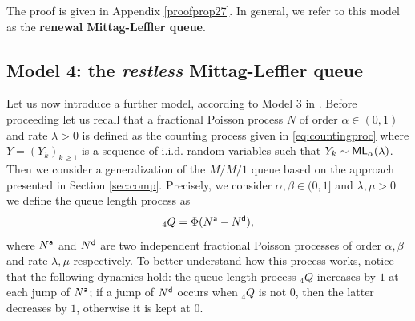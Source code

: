\documentclass[]{amsart}
\numberwithin{equation}{section}
\theoremstyle{remark}
\theoremstyle{definition}
\begin{document}
{The proof is given in Appendix \ref{proofprop27}. In general, we refer to this model as the \textbf{renewal Mittag-Leffler queue}.}



\subsection{Model 4: the \textit{restless} Mittag-Leffler queue}
Let us now introduce a further model, according to Model 3 in \cite{butt2023queuing}. {Before proceeding let us recall that a fractional Poisson process $N$ of order $\alpha \in (0,1)$ and rate $\lambda>0$ is defined as the counting process given in \eqref{eq:countingproc} where $Y=(Y_k)_{k \ge 1}$ is a sequence of i.i.d. random variables such that $Y_k \sim {\sf ML}_\alpha(\lambda)$. Then we consider a generalization of the $M/M/1$ queue based on the approach presented in Section \ref{sec:comp}. Precisely, we consider $\alpha,\beta \in (0,1]$ and $\lambda,\mu>0$ we define the queue length process as
\begin{equation*}
	{}_4Q=\Phi(N^{\sf a}-N^{\sf d}),
\end{equation*}
where $N^{\sf a}$ and $N^{\sf d}$ are two independent fractional Poisson processes of order $\alpha,\beta$ and rate $\lambda,\mu$ respectively. To better understand how this process works, notice that the following dynamics hold: the queue length process ${}_4Q$ increases by $1$ at each jump of $N^{\sf a}$; if a jump of $N^{\sf d}$ occurs when ${}_4Q$ is not $0$, then the latter decreases by $1$, otherwise it is kept at $0$.}



\end{document}
